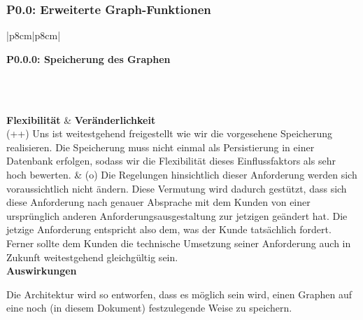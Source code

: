 \documentclass[enabledeprecatedfontcommands,fontsize=11pt,paper=a4,twoside]{scrartcl}
\newcounter{one}
\newcounter{two}[one]
\newcounter{three}[two]
\newcommand{\tone}{0\theone}
\newcommand{\ttwo}{0\thetwo}
\newcommand{\two}{\stepcounter{two}0\thetwo}
\newcommand{\three}{\stepcounter{three}0\thethree}
\begin{document}
\subsubsection*{\hypertarget{u}{P\tone.\two}: Erweiterte Graph-Funktionen}
\begin{tabular} {|p{8cm}|p{8cm}|}
	\hline
	 {\parbox{16cm}{\textbf{\hypertarget{v}{P\tone.\ttwo.\three}: Speicherung des Graphen}} }\\ \hline \hline
	\rule{0pt}{4ex}\\ [2ex] \hline
	\textbf{Flexibilität}  & \textbf{Veränderlichkeit} \\
	(++) Uns ist weitestgehend freigestellt wie wir die vorgesehene Speicherung realisieren. Die Speicherung muss nicht einmal als Persistierung in einer Datenbank erfolgen, sodass wir die Flexibilität dieses Einflussfaktors als sehr hoch bewerten. &
	(o) Die Regelungen hinsichtlich dieser Anforderung werden sich voraussichtlich nicht ändern. Diese Vermutung wird dadurch gestützt, dass sich diese Anforderung nach genauer Absprache mit dem Kunden von einer ursprünglich anderen Anforderungsausgestaltung zur jetzigen geändert hat. Die jetzige Anforderung entspricht also dem, was der Kunde tatsächlich fordert. Ferner sollte dem Kunden die technische Umsetzung seiner Anforderung auch in Zukunft weitestgehend gleichgültig sein. \\ \hline
	 {\textbf{Auswirkungen}} \\
	 {\parbox{16cm}{Die Architektur wird so entworfen, dass es möglich sein wird, einen Graphen auf eine noch (in diesem Dokument) festzulegende Weise zu speichern.} }\\ \hline
\end{tabular}
\\ \\ \\ \\ \\
\end{document}

